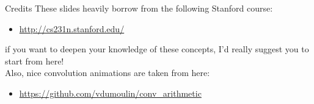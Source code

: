 \begin{frame}{Credits}
These slides heavily borrow from the following Stanford course:
\begin{itemize}
\item \url{http://cs231n.stanford.edu/}
\end{itemize}
if you want to deepen your knowledge of these concepts, I'd really suggest you to start from here!\\
\vspace{0.2cm}
Also, nice convolution animations are taken from here:
\begin{itemize}
\item \url{https://github.com/vdumoulin/conv_arithmetic}
\end{itemize}
\end{frame}